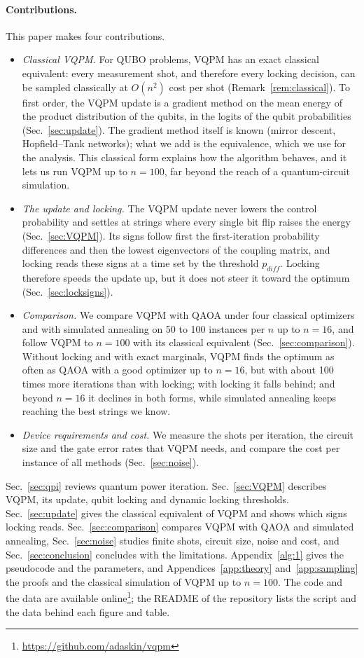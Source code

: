 \documentclass[onecolumn,10pt]{article}
\theoremstyle{remark}
\theoremstyle{plain}
\begin{document}
\paragraph{Contributions.} This paper makes four contributions.
\begin{itemize}
\item[(i)] \emph{Classical VQPM.} For QUBO problems, VQPM has an exact classical equivalent: every measurement shot, and therefore every locking decision, can be sampled classically at $O(n^2)$ cost per shot (Remark~\ref{rem:classical}). To first order, the VQPM update is a gradient method on the mean energy of the product distribution of the qubits, in the logits of the qubit probabilities (Sec.~\ref{sec:update}). The gradient method itself is known (mirror descent, Hopfield--Tank networks); what we add is the equivalence, which we use for the analysis. This classical form explains how the algorithm behaves, and it lets us run VQPM up to $n=100$, far beyond the reach of a quantum-circuit simulation.
\item[(ii)] \emph{The update and locking.} The VQPM update never lowers the control probability and settles at strings where every single bit flip raises the energy (Sec.~\ref{sec:VQPM}). Its signs follow first the first-iteration probability differences and then the lowest eigenvectors of the coupling matrix, and locking reads these signs at a time set by the threshold $p_{diff}$. Locking therefore speeds the update up, but it does not steer it toward the optimum (Sec.~\ref{sec:locksigns}).
\item[(iii)] \emph{Comparison.} We compare VQPM with QAOA under four classical optimizers and with simulated annealing on 50 to 100 instances per $n$ up to $n=16$, and follow VQPM to $n=100$ with its classical equivalent (Sec.~\ref{sec:comparison}). Without locking and with exact marginals, VQPM finds the optimum as often as QAOA with a good optimizer up to $n=16$, but with about 100 times more iterations than with locking; with locking it falls behind; and beyond $n=16$ it declines in both forms, while simulated annealing keeps reaching the best strings we know.
\item[(iv)] \emph{Device requirements and cost.} We measure the shots per iteration, the circuit size and the gate error rates that VQPM needs, and compare the cost per instance of all methods (Sec.~\ref{sec:noise}).
\end{itemize}

Sec.~\ref{sec:qpi} reviews quantum power iteration. Sec.~\ref{sec:VQPM} describes VQPM, its update, qubit locking and dynamic locking thresholds. Sec.~\ref{sec:update} gives the classical equivalent of VQPM and shows which signs locking reads. Sec.~\ref{sec:comparison} compares VQPM with QAOA and simulated annealing, Sec.~\ref{sec:noise} studies finite shots, circuit size, noise and cost, and Sec.~\ref{sec:conclusion} concludes with the limitations. Appendix~\ref{alg:1} gives the pseudocode and the parameters, and Appendices~\ref{app:theory} and~\ref{app:sampling} the proofs and the classical simulation of VQPM up to $n=100$. The code and the data are available online\footnote{\url{https://github.com/adaskin/vqpm}}; the README of the repository lists the script and the data behind each figure and table.
\end{document}
